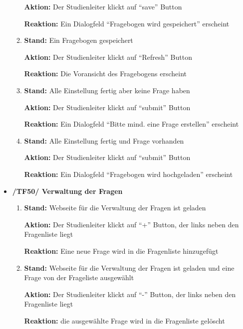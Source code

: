 \documentclass[a4paper]{scrreprt}
\begin{document}
\begin{itemize}
\begin{enumerate}
                              \par \textbf{Aktion: }Der \gls{Studienleiter} klickt auf ``save'' Button
                              \par \textbf{Reaktion: }Ein Dialogfeld ``Fragebogen wird gespeichert'' erscheint
                        \item \par \textbf{Stand: }Ein Fragebogen gespeichert
                              \par \textbf{Aktion: }Der \gls{Studienleiter} klickt auf ``Refresh'' Button
                              \par \textbf{Reaktion: }Die Voransicht des Fragebogens erscheint
                        \item \par \textbf{Stand: }Alle Einstellung fertig aber keine Frage haben
                              \par \textbf{Aktion: }Der \gls{Studienleiter} klickt auf ``submit'' Button
                              \par \textbf{Reaktion: }Ein Dialogfeld ``Bitte mind. eine Frage erstellen'' erscheint
                        \item \par \textbf{Stand: }Alle Einstellung fertig und Frage vorhanden
                              \par \textbf{Aktion: }Der \gls{Studienleiter} klickt auf ``submit'' Button
                              \par \textbf{Reaktion: }Ein Dialogfeld ``Fragebogen wird hochgeladen'' erscheint
                    \end{enumerate}

                \item \textbf{/TF50/ Verwaltung der Fragen}
                        \begin{enumerate}
                        \item \par \textbf{Stand: } Webseite für die Verwaltung der Fragen ist geladen
                              \par \textbf{Aktion: } Der \gls{Studienleiter} klickt auf ``+'' Button, der links neben den Fragenliste liegt
                              \par \textbf{Reaktion: } Eine neue Frage wird in die Fragenliste hinzugefügt

                        \item \par \textbf{Stand: } Webseite für die Verwaltung der Fragen ist geladen und eine Frage von der Frageliste ausgewählt
                              \par \textbf{Aktion: }  Der \gls{Studienleiter} klickt auf ``-'' Button, der links neben den Fragenliste liegt
                              \par \textbf{Reaktion: } die ausgewählte Frage wird in die Fragenliste gelöscht


\end{enumerate}
\end{itemize}
\end{document}
